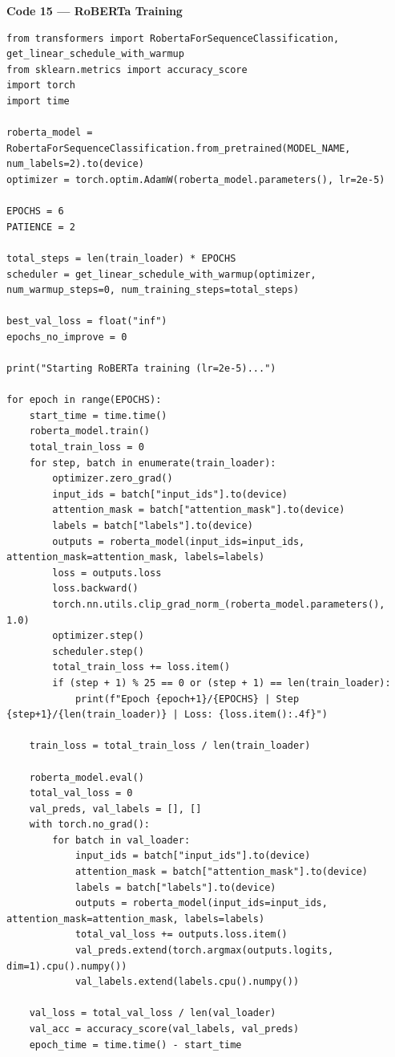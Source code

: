 \documentclass[11pt,a4paper]{article}
\begin{document}
\noindent\textbf{Code 15 --- RoBERTa Training}
\begin{lstlisting}
from transformers import RobertaForSequenceClassification, get_linear_schedule_with_warmup
from sklearn.metrics import accuracy_score
import torch
import time

roberta_model = RobertaForSequenceClassification.from_pretrained(MODEL_NAME, num_labels=2).to(device)
optimizer = torch.optim.AdamW(roberta_model.parameters(), lr=2e-5)

EPOCHS = 6
PATIENCE = 2

total_steps = len(train_loader) * EPOCHS
scheduler = get_linear_schedule_with_warmup(optimizer, num_warmup_steps=0, num_training_steps=total_steps)

best_val_loss = float("inf")
epochs_no_improve = 0

print("Starting RoBERTa training (lr=2e-5)...")

for epoch in range(EPOCHS):
    start_time = time.time()
    roberta_model.train()
    total_train_loss = 0
    for step, batch in enumerate(train_loader):
        optimizer.zero_grad()
        input_ids = batch["input_ids"].to(device)
        attention_mask = batch["attention_mask"].to(device)
        labels = batch["labels"].to(device)
        outputs = roberta_model(input_ids=input_ids, attention_mask=attention_mask, labels=labels)
        loss = outputs.loss
        loss.backward()
        torch.nn.utils.clip_grad_norm_(roberta_model.parameters(), 1.0)
        optimizer.step()
        scheduler.step()
        total_train_loss += loss.item()
        if (step + 1) % 25 == 0 or (step + 1) == len(train_loader):
            print(f"Epoch {epoch+1}/{EPOCHS} | Step {step+1}/{len(train_loader)} | Loss: {loss.item():.4f}")

    train_loss = total_train_loss / len(train_loader)

    roberta_model.eval()
    total_val_loss = 0
    val_preds, val_labels = [], []
    with torch.no_grad():
        for batch in val_loader:
            input_ids = batch["input_ids"].to(device)
            attention_mask = batch["attention_mask"].to(device)
            labels = batch["labels"].to(device)
            outputs = roberta_model(input_ids=input_ids, attention_mask=attention_mask, labels=labels)
            total_val_loss += outputs.loss.item()
            val_preds.extend(torch.argmax(outputs.logits, dim=1).cpu().numpy())
            val_labels.extend(labels.cpu().numpy())

    val_loss = total_val_loss / len(val_loader)
    val_acc = accuracy_score(val_labels, val_preds)
    epoch_time = time.time() - start_time


\end{lstlisting}
\end{document}
